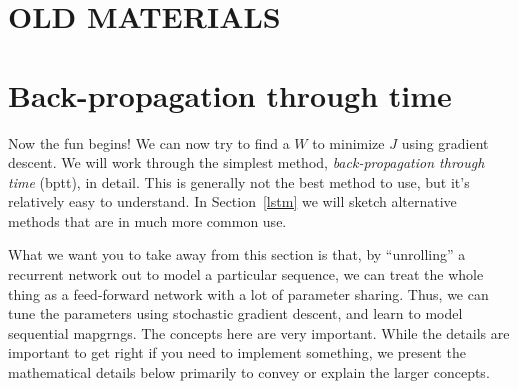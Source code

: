        

\iffalse

        

\section{OLD MATERIALS}




\section{Back-propagation through time}
\label{sec:bptt}

Now the fun begins!  We can now try to find a $W$ to minimize $J$
using gradient descent.  We will work through the simplest method,
{\em back-propagation through time} ({\sc bptt}), in detail.  This is generally not the best
method to use, but it's relatively easy to understand.  In
Section~\ref{lstm} we will sketch alternative methods that are in much
more common use.

\bigskip 
\begin{noticebox}
  What we want you to take away from this section is that, by
  ``unrolling'' a recurrent network out to model a particular
  sequence, we can treat the whole thing as a feed-forward network
  with a lot of parameter sharing.  Thus, we can tune the parameters
  using stochastic gradient descent, and learn to model sequential
  mapgrngs.  The concepts here are very important.  While the details
  are important to get right if you need to implement something, we
  present the mathematical details below primarily to convey or
  explain the larger concepts.
\end{noticebox}


